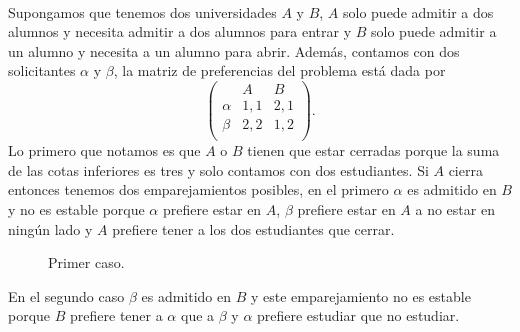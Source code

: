 \begin{eje}
\cite{Todo}\\
Supongamos que tenemos dos universidades $A$ y $B$, $A$ solo puede admitir a dos alumnos y necesita admitir a dos alumnos para entrar y $B$ solo puede admitir a un alumno y necesita a un alumno para abrir. Además, contamos con dos solicitantes $\alpha$ y $\beta$, la matriz de preferencias del problema está dada por 
$$\begin{pmatrix}
& A & B \\
\alpha & 1,1 & 2,1 \\
\beta & 2,2 & 1,2 \\ 
\end{pmatrix}.$$
Lo primero que notamos es que $A$ o $B$ tienen que estar cerradas porque la suma de las cotas inferiores es tres y solo contamos con dos estudiantes. Si $A$ cierra entonces tenemos dos emparejamientos posibles, en el primero $\alpha$ es admitido en $B$ y no es estable porque $\alpha$ prefiere estar en $A$, $\beta$ prefiere estar en $A$ a no estar en ningún lado y $A$ prefiere tener a los dos estudiantes que cerrar. 
\begin{figure}[H]\centering


\caption{Primer caso.}
\end{figure}
En el segundo caso $\beta$ es admitido en $B$ y este emparejamiento no es estable porque $B$ prefiere tener a $\alpha$ que a $\beta$ y $\alpha$ prefiere estudiar que no estudiar. 
\begin{figure}[H]\centering


\end{figure}
\end{eje}
